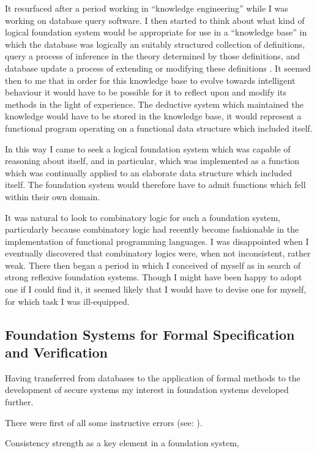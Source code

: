 \documentclass[10pt,titlepage]{book}
\begin{document}
It resurfaced after a period working in ``knowledge engineering'' \cite{jones82} while I was working on database query software.
I then started to think about what kind of logical foundation system would be appropriate for use in a ``knowledge base'' in which the database was logically an suitably structured collection of definitions, query a process of inference in the theory determined by those definitions, and database update a process of extending or modifying these definitions \cite{jones85}.
It seemed then to me that in order for this knowledge base to evolve towards intelligent behaviour it would have to be possible for it to reflect upon and modify its methods in the light of experience.
The deductive system which maintained the knowledge would have to be stored in the knowledge base, it would represent a functional program operating on a functional data structure which included itself.

In this way I came to seek a logical foundation system which was capable of reasoning about itself, and in particular, which was implemented as a function which was continually applied to an elaborate data structure which included itself.
The foundation system would therefore have to admit functions which fell within their own domain.

It was natural to look to combinatory logic for such a foundation system, particularly because combinatory logic had recently become fashionable in the implementation of functional programming languages.
I was disappointed when I eventually discovered that combinatory logics were, when not inconsistent, rather weak.
There then began a period in which I conceived of myself as in search of strong reflexive foundation systems.
Though I might have been happy to adopt one if I could find it, it seemed likely that I would have to devise one for myself, for which task I was ill-equipped. 

\subsection[Foundation Systems]{Foundation Systems for Formal Specification and Verification}

Having transferred from databases to the application of formal methods to the development of secure systems my interest in foundation systems developed further.

There were first of all some instructive errors (see: \cite{jones86a,jones86b}).

Consistency strength as a key element in a foundation system,
\end{document}
